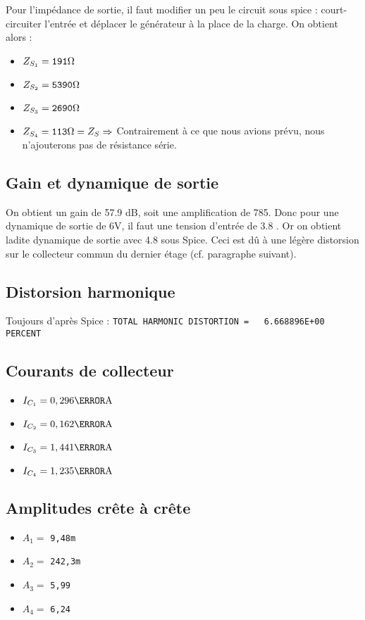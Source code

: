 \documentclass[11pt;a4paper]{report}
\begin{document}
    Pour l'impédance de sortie, il faut modifier un peu le circuit sous spice : court-circuiter l'entrée et déplacer le générateur à la place de la charge. On obtient alors :
    \begin{itemize}
     \item $Z_{S_1} = \verb|191|\ohm$
     \item $Z_{S_2} = \verb|5390|\ohm$
     \item $Z_{S_3} = \verb|2690|\ohm$
     \item $Z_{S_4} = \verb|113|\ohm = Z_S \Rightarrow$ Contrairement à ce que nous avions prévu, nous n'ajouterons pas de résistance série.
    \end{itemize}

   \subsection{Gain et dynamique de sortie}
    On obtient un gain de 57.9 dB, soit une amplification de 785.
    Donc pour une dynamique de sortie de 6V, il faut une tension d'entrée de 3.8 \milli\volt.
    Or on obtient ladite dynamique de sortie avec 4.8 \milli\volt  sous Spice. Ceci est dû à une légère distorsion sur le collecteur commun du dernier étage (cf. paragraphe suivant).
   
   \subsection{Distorsion harmonique}
    Toujours d'après Spice : \verb|TOTAL HARMONIC DISTORTION =   6.668896E+00 PERCENT|

   \subsection{Courants de collecteur}
    \begin{itemize}
     \item $I_{C_1} = 0,296 \milli\ampere$
     \item $I_{C_2} = 0,162 \milli\ampere$
     \item $I_{C_3} = 1,441 \milli\ampere$
     \item $I_{C_4} = 1,235 \milli\ampere$
    \end{itemize}

   \subsection{Amplitudes crête à crête}
    \begin{itemize}
     \item $A_1 =$ \verb|9,48m| \volt
     \item $A_2 =$ \verb|242,3m| \volt
     \item $A_3 =$ \verb|5,99| \volt
     \item $A_4 =$ \verb|6,24| \volt
    \end{itemize}
\end{document}
